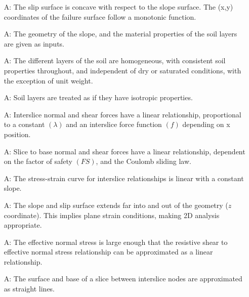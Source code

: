 \documentclass[12pt]{article}
\newcounter{assumpnum} %
\begin{document}
\begin{enumerate}[label=A\arabic*:,ref={\arabic*}]
\item [A\refstepcounter{assumpnum}\theassumpnum: \label{A_Concave}] The
  slip surface is concave with respect to the slope surface. The (x,y)
  coordinates of the failure surface follow a monotonic function.

\item [A\refstepcounter{assumpnum}\theassumpnum: \label{A_Input}] The
  geometry of the slope, and the material properties of the soil
  layers are given as inputs.

\item [A\refstepcounter{assumpnum}\theassumpnum: \label{A_Homo}] The
  different layers of the soil are homogeneous, with consistent soil
  properties throughout, and independent of dry or saturated
  conditions, with the exception of unit weight.

\item [A\refstepcounter{assumpnum}\theassumpnum: \label{A_Isotropic}]
  Soil layers are treated as if they have isotropic properties.
  
\item [A\refstepcounter{assumpnum}\theassumpnum: \label{A_Base}]
  Interslice normal and shear forces have a linear relationship,
  proportional to a constant $\left({\lambda}\right)$ and an
  interslice force function $\left({f}\right)$ depending on x
  position.

\item [A\refstepcounter{assumpnum}\theassumpnum: \label{A_Interslice}]
  Slice to base normal and shear forces have a linear relationship,
  dependent on the factor of safety $\left({FS}\right)$, and the
  Coulomb sliding law.

\item
  [A\refstepcounter{assumpnum}\theassumpnum: \label{A_StressStrain}]
  The stress-strain curve for interslice relationships is linear with
  a constant slope.
  
\item [A\refstepcounter{assumpnum}\theassumpnum: \label{A_2D}] The
  slope and slip surface extends far into and out of the geometry ($z$
  coordinate). This implies plane strain conditions, making 2D
  analysis appropriate.

\item [A\refstepcounter{assumpnum}\theassumpnum: \label{A_Lin}] The
  effective normal stress is large enough that the resistive shear to
  effective normal stress relationship can be approximated as a linear
  relationship.

\item [A\refstepcounter{assumpnum}\theassumpnum: \label{A_Straight}]
  The surface and base of a slice between interslice nodes are
  approximated as straight lines.
\end{enumerate}
\end{document}
